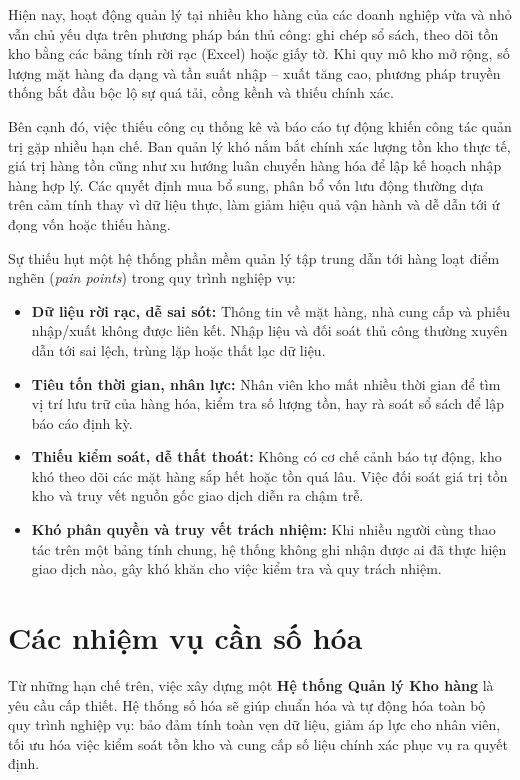 \documentclass[12pt,a4paper]{report}
\begin{document}
Hiện nay, hoạt động quản lý tại nhiều kho hàng của các doanh nghiệp vừa và nhỏ
vẫn chủ yếu dựa trên phương pháp bán thủ công: ghi chép sổ sách, theo dõi tồn
kho bằng các bảng tính rời rạc (Excel) hoặc giấy tờ. Khi quy mô kho mở rộng, số
lượng mặt hàng đa dạng và tần suất nhập -- xuất tăng cao, phương pháp truyền
thống bắt đầu bộc lộ sự quá tải, cồng kềnh và thiếu chính xác.

Bên cạnh đó, việc thiếu công cụ thống kê và báo cáo tự động khiến công tác quản
trị gặp nhiều hạn chế. Ban quản lý khó nắm bắt chính xác lượng tồn kho thực tế,
giá trị hàng tồn cũng như xu hướng luân chuyển hàng hóa để lập kế hoạch nhập
hàng hợp lý. Các quyết định mua bổ sung, phân bổ vốn lưu động thường dựa trên
cảm tính thay vì dữ liệu thực, làm giảm hiệu quả vận hành và dễ dẫn tới ứ đọng
vốn hoặc thiếu hàng.

Sự thiếu hụt một hệ thống phần mềm quản lý tập trung dẫn tới hàng loạt điểm
nghẽn (\textit{pain points}) trong quy trình nghiệp vụ:

\begin{itemize}[leftmargin=1.4cm]
  \item \textbf{Dữ liệu rời rạc, dễ sai sót:} Thông tin về mặt hàng, nhà cung
  cấp và phiếu nhập/xuất không được liên kết. Nhập liệu và đối soát thủ công
  thường xuyên dẫn tới sai lệch, trùng lặp hoặc thất lạc dữ liệu.

  \item \textbf{Tiêu tốn thời gian, nhân lực:} Nhân viên kho mất nhiều thời gian
  để tìm vị trí lưu trữ của hàng hóa, kiểm tra số lượng tồn, hay rà soát sổ sách
  để lập báo cáo định kỳ.

  \item \textbf{Thiếu kiểm soát, dễ thất thoát:} Không có cơ chế cảnh báo tự
  động, kho khó theo dõi các mặt hàng sắp hết hoặc tồn quá lâu. Việc đối soát
  giá trị tồn kho và truy vết nguồn gốc giao dịch diễn ra chậm trễ.

  \item \textbf{Khó phân quyền và truy vết trách nhiệm:} Khi nhiều người cùng
  thao tác trên một bảng tính chung, hệ thống không ghi nhận được ai đã thực
  hiện giao dịch nào, gây khó khăn cho việc kiểm tra và quy trách nhiệm.
\end{itemize}

\section{Các nhiệm vụ cần số hóa}

Từ những hạn chế trên, việc xây dựng một \textbf{Hệ thống Quản lý Kho hàng} là
yêu cầu cấp thiết. Hệ thống số hóa sẽ giúp chuẩn hóa và tự động hóa toàn bộ quy
trình nghiệp vụ: bảo đảm tính toàn vẹn dữ liệu, giảm áp lực cho nhân viên, tối
ưu hóa việc kiểm soát tồn kho và cung cấp số liệu chính xác phục vụ ra quyết
định.
\end{document}

